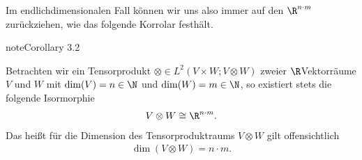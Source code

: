\documentclass[letterpaper,10pt,english]{jupyterBook}
\begin{document}
\sphinxAtStartPar
Im endlich\sphinxhyphen{}dimensionalen Fall können wir uns also immer auf den \(\R^{n \cdot m}\) zurückziehen, wie das folgende Korrolar festhält.
\label{vektoranalysis/tensor:cor:isomorphieEndlichDimensional}
\begin{sphinxadmonition}{note}{Corollary 3.2}



\sphinxAtStartPar
Betrachten wir ein Tensorprodukt \(\otimes \in L^2(V \times W; V \otimes W)\) zweier  \(\R\)\sphinxhyphen{}Vektorräume \(V\) und \(W\) mit \(\operatorname{dim}(V)=n \in \N\) und \(\operatorname{dim}(W)=m \in \N\), so existiert stets die folgende Isormorphie
\begin{equation*}
\begin{split}V \otimes W \cong \R^{n \cdot m}.\end{split}
\end{equation*}
\sphinxAtStartPar
Das heißt für die Dimension des Tensorproduktraums \(V \otimes W\) gilt offensichtlich
\begin{equation*}
\begin{split}\operatorname{dim}(V \otimes W) = n\cdot m.\end{split}
\end{equation*}\end{sphinxadmonition}
\end{document}
